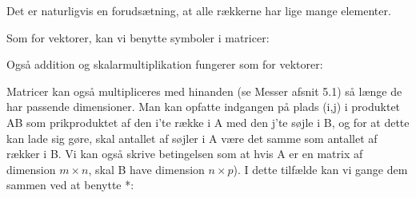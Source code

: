 \documentclass[letterpaper,10pt,english]{jupyterBook}
\begin{document}
\begin{sphinxVerbatim}[commandchars=\\\{\}]
  \PYG{p}{[}\PYG{p}{[}  \PYG{p}{]} \PYG{p}{[}  \PYG{p}{]} \PYG{p}{[}  \PYG{p}{]}\PYG{p}{]}
\end{sphinxVerbatim}

\noindent{}

Det er naturligvis en forudsætning, at alle rækkerne har lige mange elementer.

Som for vektorer, kan vi benytte symboler i matricer:

\begin{sphinxVerbatim}[commandchars=\\\{\}]
  \PYG{p}{[}\PYG{p}{[}  \PYG{p}{]} \PYG{p}{[}  \PYG{p}{]} \PYG{p}{[}  \PYG{p}{]}\PYG{p}{]}
\end{sphinxVerbatim}

\noindent{}

Også addition og skalarmultiplikation fungerer som for vektorer:

\begin{sphinxVerbatim}[commandchars=\\\{\}]
    
\end{sphinxVerbatim}

\noindent{}

\begin{sphinxVerbatim}[commandchars=\\\{\}]
\end{sphinxVerbatim}

\noindent{}

Matricer kan også multipliceres med hinanden (se Messer afsnit 5.1) så længe de har passende dimensioner. Man kan opfatte indgangen på plads (i,j) i produktet AB som prikproduktet af den i’te række i A med den j’te søjle i B, og for at dette kan lade sig gøre, skal antallet af søjler i A være det samme som antallet af rækker i B. Vi kan også skrive betingelsen som at hvis A er en matrix af dimension \(m \times n\), skal B have dimension \(n \times p\)). I dette tilfælde kan vi gange dem sammen ved at benytte *:
\end{document}
